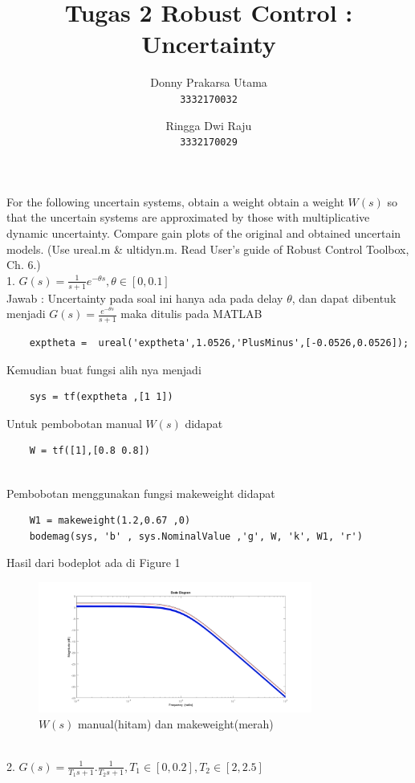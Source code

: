 \documentclass[14pt]{article}
\title{Tugas 2 Robust Control : Uncertainty }
\author{Donny Prakarsa Utama\\ \texttt{3332170032}
\and Ringga Dwi Raju\\ \texttt{3332170029} }
\begin{document}
For the following uncertain systems, obtain a weight obtain a weight $W(s)$ so that the uncertain systems are approximated by those with multiplicative dynamic uncertainty. Compare gain plots of the original and obtained uncertain models. (Use ureal.m & ultidyn.m. Read User’s guide of Robust Control Toolbox, Ch. 6.)\\
1. $G(s)=\frac{1}{s+1}e^{-\theta s} ,\theta \in [0,0.1]$\\

Jawab :
Uncertainty pada soal ini hanya ada pada delay $ \theta $, dan dapat dibentuk menjadi $G(s)=\frac{e^{-\theta s}}{s+1}$ maka ditulis pada MATLAB
\begin{verbatim}
    exptheta =  ureal('exptheta',1.0526,'PlusMinus',[-0.0526,0.0526]);
\end{verbatim}
Kemudian buat fungsi alih nya menjadi
\begin{verbatim}
    sys = tf(exptheta ,[1 1])
\end{verbatim}
Untuk pembobotan manual $W(s)$ didapat
\begin{verbatim}
    W = tf([1],[0.8 0.8]) 
\end{verbatim}\\
Pembobotan menggunakan fungsi makeweight didapat
\begin{verbatim}
    W1 = makeweight(1.2,0.67 ,0)
    bodemag(sys, 'b' , sys.NominalValue ,'g', W, 'k', W1, 'r')
\end{verbatim}
Hasil dari bodeplot ada di Figure 1
\begin{figure}[h]
    \centering
    \includegraphics[width=90mm]{makeweight1.png}
    \caption{$W(s)$ manual(hitam) dan makeweight(merah) \label{overflow}}
\end{figure}\\
2. $G(s)=\frac{1}{T_{1}s+1}.\frac{1}{T_{2}s+1} ,T_{1} \in [0,0.2], T_{2} \in [2,2.5]$ \\
\end{document}
